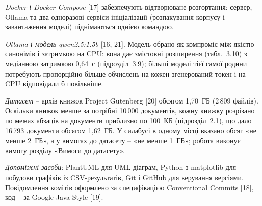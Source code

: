 \textit{Docker і Docker Compose} [17] забезпечують відтворюване розгортання: сервер, Ollama та
два одноразові сервіси ініціалізації (розпакування корпусу і завантаження моделі)
піднімаються однією командою.

\textit{Ollama і модель qwen2.5:1.5b} [16, 21]. Модель обрано як компроміс між якістю
синонімів і затримкою на CPU: вона дає змістовні розширення (табл.~3.10) з медіанною
затримкою 0,64~с (підрозділ~3.9); більші моделі тієї самої родини потребують пропорційно
більше обчислень на кожен згенерований токен і на CPU відповідали б повільніше.

\textit{Датасет} -- архів книжок Project Gutenberg [20] обсягом 1,70~ГБ (2\,809 файлів). Оскільки
книжок менше за потрібні 10\,000 документів, кожну книжку розрізано по межах абзаців на
документи приблизно по 100~КБ (підрозділ~2.1), що дало 16\,793 документи обсягом 1,62~ГБ.
У силабусі в одному місці вказано обсяг «не менше 2~ГБ», а у вимогах до датасету -- «не менше
1~ГБ»; робота виконує вимогу розділу «Вимоги до датасету».

\textit{Допоміжні засоби}: PlantUML для UML-діаграм, Python з matplotlib для побудови
графіків із CSV-результатів, Git і GitHub для керування версіями. Повідомлення комітів
оформлено за специфікацією Conventional Commits [18], код -- за Google Java Style [19].
